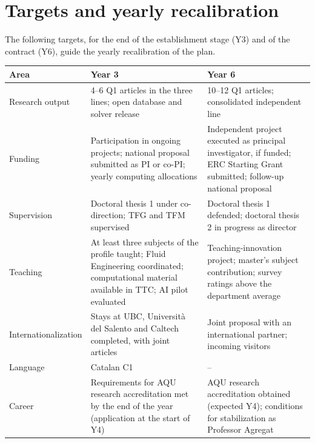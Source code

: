 \documentclass[11pt]{article}
\begin{document}
\section{Targets and yearly recalibration}
The following targets, for the end of the establishment stage (Y3) and of the contract (Y6),
guide the yearly recalibration of the plan.
\begin{center}\small
\begin{tabularx}{\textwidth}{@{}p{3.0cm}XX@{}}
\toprule
\textbf{Area} & \textbf{Year 3} & \textbf{Year 6} \\
\midrule
Research output & 4--6 Q1 articles in the three lines; open database and solver release & 10--12 Q1 articles; consolidated independent line \\
Funding & Participation in ongoing projects; national proposal submitted as PI or co-PI; yearly computing allocations & Independent project executed as principal investigator, if funded; ERC Starting Grant submitted; follow-up national proposal \\
Supervision & Doctoral thesis 1 under co-direction; TFG and TFM supervised & Doctoral thesis 1 defended; doctoral thesis 2 in progress as director \\
Teaching & At least three subjects of the profile taught; Fluid Engineering coordinated; computational material available in TTC; AI pilot evaluated & Teaching-innovation project; master's subject contribution; survey ratings above the department average \\
Internationalization & Stays at UBC, Universit\`a del Salento and Caltech completed, with joint articles & Joint proposal with an international partner; incoming visitors \\
Language & Catalan C1 & -- \\
Career & Requirements for AQU research accreditation met by the end of the year (application at the start of Y4) & AQU research accreditation obtained (expected Y4); conditions for stabilization as Professor Agregat \\
\bottomrule
\end{tabularx}
\end{center}
\end{document}

